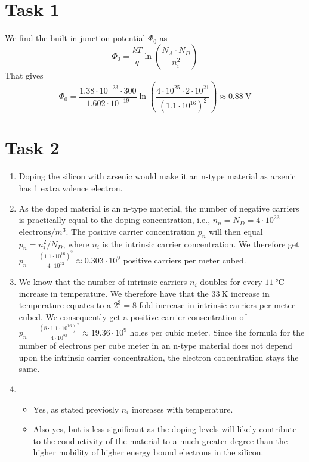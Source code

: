 \documentclass[a4paper,11pt,norsk]{article}
\begin{document}


\section*{Task 1}
We find the built-in junction potential $\Phi_{0}$ as 
\[
    \Phi_0 = \frac{kT}{q} \ln{\left(\frac{N_A \cdot N_D}{n_i^2}\right)}
\]
That gives 
\[
    \Phi_0 = \frac{1.38 \cdot 10^{-23} \cdot 300}{1.602 \cdot 10^{-19}} \ln{\left(\frac{4 \cdot 10^{25} \cdot 2 \cdot 10^{21}}{(1.1 \cdot 10^{16})^2}\right)} \approx \SI{0.88}{\volt}
\]

\section*{Task 2}
\begin{enumerate}
\item Doping the silicon with arsenic would make it an n-type material as arsenic has 1 extra valence electron.
\item As the doped material is an n-type material, the number of negative carriers is practically equal to 
    the doping concentration, i.e., $n_n = N_D = 4 \cdot 10^{23}$ $\text{electrons}/m^3$. The positive carrier 
    concentration $p_n$ will then equal $p_n = n_i^2/N_D$, where $n_i$ is the intrinsic carrier concentration. We
    therefore get $p_n = \frac{(1.1 \cdot 10^{16})^2}{4 \cdot 10^{23}} \approx 0.303 \cdot 10^9$ positive carriers per 
    meter cubed.
\item We know that the number of intrinsic carriers $n_i$ doubles for every $\SI{11}{\celsius}$ increase in temperature.
    We therefore have that the $\SI{33}{\kelvin}$ increase in temperature equates to a $2^3 = 8$ fold increase in 
    intrinsic carriers per meter cubed. We consequently get a positive carrier consentration of 
    $p_n = \frac{(8 \cdot 1.1 \cdot 10^{16})^2}{4 \cdot 10^{23}} \approx 19.36 \cdot 10^9$ holes per cubic meter.
    Since the formula for the number of electrons per cube meter in an n-type material does not depend upon the 
    intrinsic carrier concentration, the electron concentration stays the same.
\item \hphantom{hei}
    \begin{itemize}
        \item Yes, as stated previosly $n_i$ increases with temperature.
        \item Also yes, but is less significant as the doping levels will likely contribute to the conductivity of the material to a much greater degree than the higher mobility of 
            higher energy bound electrons in the silicon.
    \end{itemize}
\end{enumerate}
\end{document}

